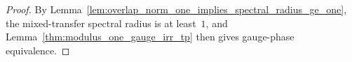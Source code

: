 \begin{proof}\leanok
    By Lemma~\ref{lem:overlap_norm_one_implies_spectral_radius_ge_one}, the
    mixed-transfer spectral radius is at least~$1$, and
    Lemma~\ref{thm:modulus_one_gauge_irr_tp} then gives gauge-phase
    equivalence.
\end{proof}

